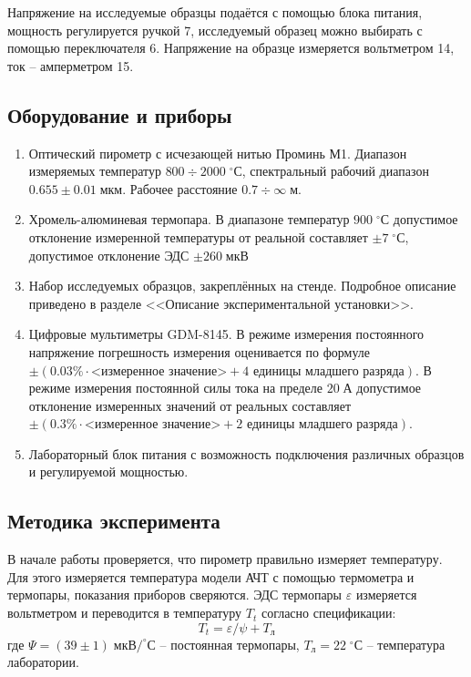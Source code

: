 \documentclass[10pt,a4paper]{article}
\newcommand{\m}{\; м}
\newcommand{\um}{\; мкм}
\newcommand{\A}{\; А}
\newcommand{\uV}{\; мкВ}
\newcommand{\cels}{\; ^\circ С}
\begin{document}
\begin{multicols}{2}
	Напряжение на исследуемые образцы подаётся с помощью блока питания, мощность регулируется ручкой 7, исследуемый образец можно выбирать с помощью переключателя 6. Напряжение на образце измеряется вольтметром 14, ток -- амперметром 15.
		
	\subsection*{Оборудование и приборы}
	\begin{enumerate}
		\item Оптический пирометр с исчезающей нитью Проминь М1. Диапазон измеряемых температур $800 \div 2000 \cels$, спектральный рабочий диапазон $0.655 \pm 0.01 \um$. Рабочее расстояние $0.7 \div \infty \m$.
		
		\item Хромель-алюминевая термопара. В диапазоне температур $900 \cels$ допустимое отклонение измеренной температуры от реальной составляет $\pm 7 \cels$, допустимое отклонение ЭДС $\pm 260 \uV$
		
		\item Набор исследуемых образцов, закреплённых на стенде. Подробное описание приведено в разделе <<Описание экспериментальной установки>>.
		
		\item Цифровые мультиметры GDM-8145. В режиме измерения постоянного напряжение погрешность измерения оценивается по формуле $\pm (0.03\% \cdot \text{<измеренное значение>} + 4 \text{ единицы младшего разряда})$. В режиме измерения постоянной силы тока на пределе $20 \A$ допустимое отклонение измеренных значений от реальных составляет $\pm (0.3\% \cdot \text{<измеренное значение>} + 2\text{ единицы младшего разряда})$.
		
		\item Лабораторный блок питания с возможность подключения различных образцов и регулируемой мощностью.
	\end{enumerate}
	
	\subsection*{Методика эксперимента}
	
	В начале работы проверяется, что пирометр правильно измеряет температуру. Для этого измеряется температура модели АЧТ с помощью термометра и термопары, показания приборов сверяются. ЭДС термопары $\varepsilon$ измеряется вольтметром и переводится в температуру $T_t$ согласно спецификации:
	$$
	T_t = \varepsilon / \psi + T_{л}
	$$
	где $\Psi = (39 \pm 1) \; мкВ/ ^\circ С$ -- постоянная термопары, $T_{л} = 22 \cels$ -- температура лаборатории.
	

\end{multicols}
\end{document}

